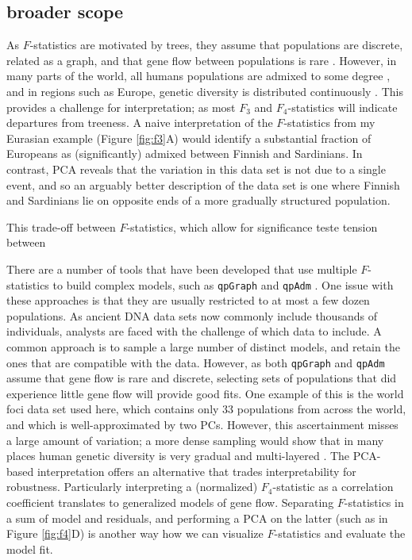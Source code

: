 \documentclass[12pt,fullpage, a4paper]{article}
\begin{document}
\subsection{broader scope}

As $F$-statistics are motivated by trees, they assume that populations are discrete, related as a graph, and that gene flow between populations is rare \citep{patterson2012,harney2021}. However, in many parts of the world, all humans populations are admixed to some degree \citep{pickrell2014}, and in regions such as Europe, genetic diversity is distributed continuously \citep{novembre2008, novembre2008a}. This provides a challenge for interpretation; as most $F_3$ and $F_4$-statistics will indicate departures from treeness. A naive interpretation of the $F$-statistics from my Eurasian example  (Figure \ref{fig:f3}A) would identify a substantial fraction of Europeans as (significantly) admixed between Finnish and Sardinians. In contrast, PCA reveals that the variation in this data set is not due to a single event, and so an arguably better description of the data set is one where Finnish and Sardinians lie on opposite ends of a more gradually structured population.

This trade-off between $F$-statistics, which allow for significance teste tension between 


There are a number of tools that have been developed that use multiple $F$-statistics to build complex models, such as \texttt{qpGraph} \citep{lazaridis2014} and \texttt{qpAdm} \citep{harney2021}. One issue with these approaches is that they are usually restricted to at most a few dozen populations. As ancient DNA data sets now commonly include thousands of individuals, analysts are faced with the challenge of which data to include. A common approach is to sample a large number of distinct models, and retain the ones that are compatible with the data. However, as both \texttt{qpGraph} and \texttt{qpAdm} assume that gene flow is rare and discrete, selecting sets of populations that did experience little gene flow will provide good fits. One example of this is the world foci data set used here, which contains only 33 populations from across the world, and which is well-approximated by two PCs. However, this ascertainment misses a large amount of variation; a more dense sampling would show that in many places human genetic diversity is very gradual and multi-layered \citep{lazaridis2014, peter2020a}. The PCA-based  interpretation offers an alternative that trades interpretability for robustness. Particularly interpreting a (normalized) $F_4$-statistic as a correlation coefficient translates to generalized models of gene flow. Separating $F$-statistics in a sum of model and residuals, and performing a PCA on the latter (such as in Figure \ref{fig:f4}D)  is another way how we can visualize $F$-statistics and evaluate the model fit.
\end{document}
